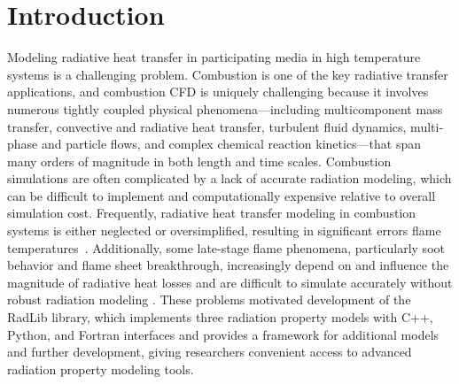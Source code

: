 \documentclass[preprint,12pt]{elsarticle}
\begin{document}
    \section{Introduction} \label{s:intro}

    Modeling radiative heat transfer in participating media in high temperature systems is a challenging problem.
    Combustion is one of the key radiative transfer applications, and combustion CFD is uniquely challenging because
    it involves numerous tightly coupled physical phenomena---including multicomponent mass transfer, convective and
    radiative heat transfer, turbulent fluid dynamics, multi-phase and particle flows, and complex chemical reaction
    kinetics---that span many orders of magnitude in both length and time scales. Combustion simulations are often
    complicated by a lack of accurate radiation modeling, which can be difficult to implement and computationally
    expensive relative to overall simulation cost. Frequently, radiative heat transfer modeling in combustion systems
    is either neglected or oversimplified, resulting in significant errors flame temperatures~\citep{Modest_2016}.
    Additionally, some late-stage flame phenomena, particularly soot behavior and flame sheet breakthrough,
    increasingly depend on and influence the magnitude of radiative heat losses and are difficult to simulate
    accurately without robust radiation modeling \cite{Modest_2013}. These problems motivated development of the
    RadLib library, which implements three radiation property models with C++, Python, and Fortran interfaces and
    provides a framework for additional models and further development, giving researchers convenient access to
    advanced radiation property modeling tools.
\end{document}
